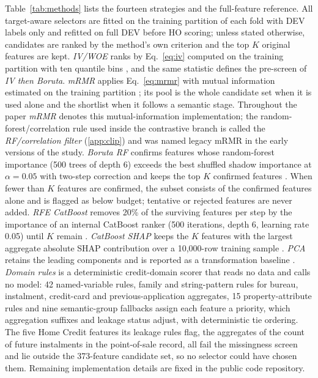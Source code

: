 \documentclass[final,5p,twocolumn]{elsarticle}
\newcommand{\Kfeat}{K}
\begin{document}
Table~\ref{tab:methods} lists the fourteen strategies and the full-feature reference. All target-aware selectors are fitted on the training partition of each fold with DEV labels only and refitted on full DEV before HO scoring; unless stated otherwise, candidates are ranked by the method's own criterion and the top $\Kfeat$ original features are kept. \emph{IV/WOE} ranks by Eq.~\eqref{eq:iv} computed on the training partition with ten quantile bins \cite{siddiqi2006}, and the same statistic defines the pre-screen of \emph{IV then Boruta}. \emph{mRMR} applies Eq.~\eqref{eq:mrmr} with mutual information estimated on the training partition \cite{peng2005,kraskov2004,ross2014}; its pool is the whole candidate set when it is used alone and the shortlist when it follows a semantic stage. Throughout the paper \emph{mRMR} denotes this mutual-information implementation; the random-forest/correlation rule used inside the contrastive branch is called the \emph{RF/correlation filter} (\ref{app:clip}) and was named legacy mRMR in the early versions of the study. \emph{Boruta RF} confirms features whose random-forest importance (500 trees of depth 6) exceeds the best shuffled shadow importance at $\alpha=0.05$ with two-step correction and keeps the top $\Kfeat$ confirmed features \cite{kursa2010,breiman2001}. When fewer than $\Kfeat$ features are confirmed, the subset consists of the confirmed features alone and is flagged as below budget; tentative or rejected features are never added. \emph{RFE CatBoost} removes 20\% of the surviving features per step by the importance of an internal CatBoost ranker (500 iterations, depth 6, learning rate 0.05) until $\Kfeat$ remain \cite{guyon2002}. \emph{CatBoost SHAP} keeps the $\Kfeat$ features with the largest aggregate absolute SHAP contribution over a 10,000-row training sample \cite{lundberg2017}. \emph{PCA} retains the leading components and is reported as a transformation baseline \cite{jolliffe2016}. \emph{Domain rules} is a deterministic credit-domain scorer that reads no data and calls no model: 42 named-variable rules, family and string-pattern rules for bureau, instalment, credit-card and previous-application aggregates, 15 property-attribute rules and nine semantic-group fallbacks assign each feature a priority, which aggregation suffixes and leakage status adjust, with deterministic tie ordering. The five Home Credit features its leakage rules flag, the aggregates of the count of future instalments in the point-of-sale record, all fail the missingness screen and lie outside the 373-feature candidate set, so no selector could have chosen them. Remaining implementation details are fixed in the public code repository.
\end{document}
